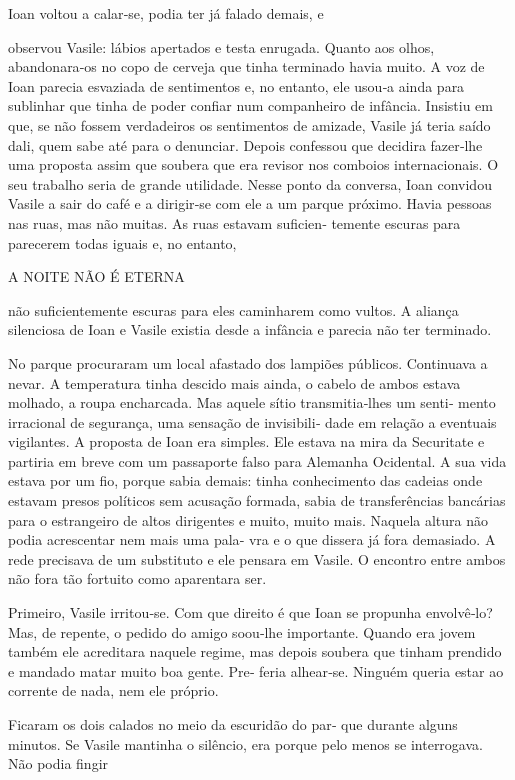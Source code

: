 Ioan voltou a calar‑se, podia ter já falado demais, e

observou Vasile: lábios apertados e testa enrugada. Quanto aos olhos,
abandonara‑os no copo de cerveja que tinha terminado havia muito. A voz
de Ioan parecia esvaziada de sentimentos e, no entanto, ele usou‑a ainda
para sublinhar que tinha de poder confiar num companheiro de infância.
Insistiu em que, se não fossem verdadeiros os sentimentos de amizade,
Vasile já teria saído dali, quem sabe até para o denunciar. Depois
confessou que decidira fazer‑lhe uma proposta assim que soubera que era
revisor nos comboios internacionais. O seu trabalho seria de grande
utilidade. Nesse ponto da conversa, Ioan convidou Vasile a sair do café
e a dirigir‑se com ele a um parque próximo. Havia pessoas nas ruas, mas
não muitas. As ruas estavam suficien‑ temente escuras para parecerem
todas iguais e, no entanto,

A NOITE NÃO É ETERNA

não suficientemente escuras para eles caminharem como vultos. A aliança
silenciosa de Ioan e Vasile existia desde a infância e parecia não ter
terminado.

No parque procuraram um local afastado dos lampiões públicos. Continuava
a nevar. A temperatura tinha descido mais ainda, o cabelo de ambos
estava molhado, a roupa encharcada. Mas aquele sítio transmitia‑lhes um
senti‑ mento irracional de segurança, uma sensação de invisibili‑ dade
em relação a eventuais vigilantes. A proposta de Ioan era simples. Ele
estava na mira da Securitate e partiria em breve com um passaporte falso
para Alemanha Ocidental. A sua vida estava por um fio, porque sabia
demais: tinha conhecimento das cadeias onde estavam presos políticos sem
acusação formada, sabia de transferências bancárias para o estrangeiro
de altos dirigentes e muito, muito mais. Naquela altura não podia
acrescentar nem mais uma pala‑ vra e o que dissera já fora demasiado. A
rede precisava de um substituto e ele pensara em Vasile. O encontro
entre ambos não fora tão fortuito como aparentara ser.

Primeiro, Vasile irritou‑se. Com que direito é que Ioan se propunha
envolvê‑lo? Mas, de repente, o pedido do amigo soou‑lhe importante.
Quando era jovem também ele acreditara naquele regime, mas depois
soubera que tinham prendido e mandado matar muito boa gente. Pre‑ feria
alhear‑se. Ninguém queria estar ao corrente de nada, nem ele próprio.

Ficaram os dois calados no meio da escuridão do par‑ que durante alguns
minutos. Se Vasile mantinha o silêncio, era porque pelo menos se
interrogava. Não podia fingir

